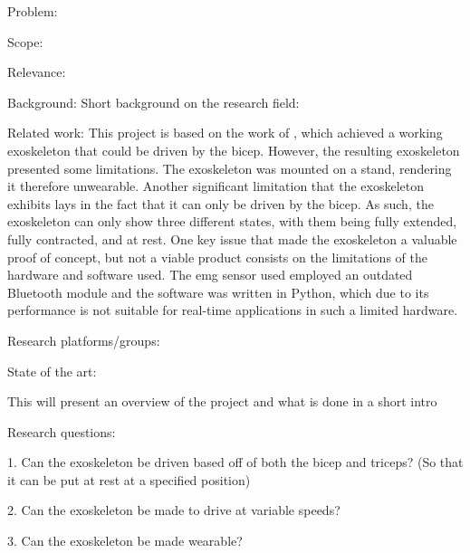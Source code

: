             Problem:
                

            Scope:
            
            Relevance: %


Background: 
    Short background on the research field:

    Related work: %
        This project is based on the work of \cite{afes}, which achieved a working exoskeleton that could be driven by the bicep. However, the resulting 
        exoskeleton presented some limitations. The exoskeleton was mounted on a stand, rendering it therefore unwearable. Another significant limitation 
        that the exoskeleton exhibits lays in the fact that it can only be driven by the bicep. As such, the exoskeleton can only show three different states, 
        with them being fully extended, fully contracted, and at rest. One key issue that made the exoskeleton a valuable proof of concept, but not a viable 
        product consists on the limitations of the hardware and software used. The \acs{emg} sensor used employed an outdated Bluetooth module and the software was 
        written in Python, which due to its performance is not suitable for real-time applications in such a limited hardware.

    Research platforms/groups:

    State of the art:


    This will present an overview of the project and what is done in a short intro


Research questions:

1.	Can the exoskeleton be driven based off of both the bicep and triceps? (So that it can be put at rest at a specified position)

2.	Can the exoskeleton be made to drive at variable speeds?

3.	Can the exoskeleton be made wearable?

